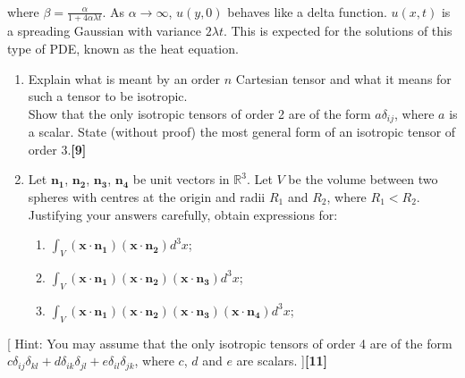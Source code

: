 \documentclass[a4paper]{article}
\begin{document}
\begin{ans}
\begin{enumerate}[label=(\alph*)]
\begin{align}
\end{align}
where $\beta=\frac{\alpha}{1+4\alpha\lambda t}$. As $\alpha\rightarrow\infty$, $u(y,0)$ behaves like a delta function. $u(x,t)$ is a spreading Gaussian with variance $2\lambda t$. This is expected for the solutions of this type of PDE, known as the heat equation.
\end{enumerate}
\end{ans}
\newpage
\begin{qns}[Tensors]\leavevmode
\begin{enumerate}[label=(\alph*)]
\item Explain what is meant by an order $n$ Cartesian tensor and what it means for such a tensor to be isotropic.\\[5pt]
Show that the only isotropic tensors of order 2 are of the form $a\delta_{ij}$, where $a$ is a scalar. State (without proof) the most general form of an isotropic tensor of order 3.\hfill\textbf{[9]}
\item Let $\mathbf{n_1}$, $\mathbf{n_2}$, $\mathbf{n_3}$, $\mathbf{n_4}$ be unit vectors in $\mathbb{R}^3$. Let $V$ be the volume between two spheres with centres at the origin and radii $R_1$ and $R_2$, where $R_1 < R_2$.\\[5pt]
Justifying your answers carefully, obtain expressions for:
\begin{enumerate}[label=(\roman*)]
    \item $\int_V(\mathbf{x}\cdot\mathbf{n_1})(\mathbf{x}\cdot\mathbf{n_2})d^3x$;
    \item $\int_V(\mathbf{x}\cdot\mathbf{n_1})(\mathbf{x}\cdot\mathbf{n_2})(\mathbf{x}\cdot\mathbf{n_3})d^3x$;
    \item $\int_V(\mathbf{x}\cdot\mathbf{n_1})(\mathbf{x}\cdot\mathbf{n_2})(\mathbf{x}\cdot\mathbf{n_3})(\mathbf{x}\cdot\mathbf{n_4})d^3x$;
\end{enumerate}
\end{enumerate}
[ Hint: You may assume that the only isotropic tensors of order 4 are of the form $c\delta_{ij}\delta_{kl}+d\delta_{ik}\delta_{jl}+e\delta_{il}\delta_{jk}$, where $c$, $d$ and $e$ are scalars. ]\hfill\textbf{[11]}
\end{qns}
\end{document}
